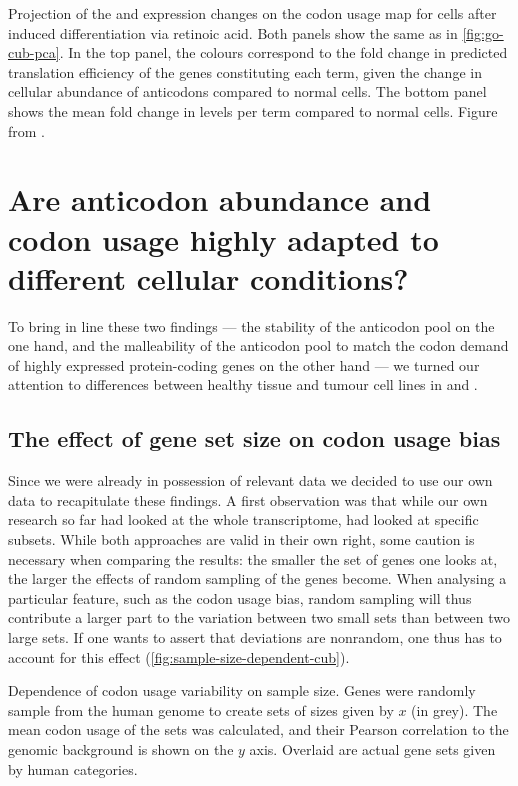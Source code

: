     {Projection of the \trna and \mrna expression changes on the codon usage
    map for cells after induced differentiation via retinoic acid.}
    {Both panels show the same \pca as in \cref{fig:go-cub-pca}. In the top
    panel, the colours correspond to the fold change in predicted translation
    efficiency of the genes constituting each \go term, given the change in
    cellular abundance of \trna anticodons compared to normal cells. The bottom
    panel shows the mean fold change in \mrna levels per \go term compared to
    normal cells. Figure from \citet{Gingold:2014}.}

\section{Are  anticodon abundance and codon usage highly adapted to
different cellular conditions?}

To bring in line these two findings — the stability of the anticodon pool on the
one hand, and the malleability of the anticodon pool to match the codon demand
of highly expressed protein-coding genes on the other hand — we turned our
attention to differences between healthy tissue and tumour cell lines in \mmu
and \hsa.

\subsection{The effect of gene set size on codon usage bias}

Since we were already in possession of relevant \trna data we decided to use our
own data to recapitulate these findings. A first observation was that while our
own research so far had looked at the whole transcriptome, \citet{Gingold:2014}
had looked at specific subsets. While both approaches are valid in their own
right, some caution is necessary when comparing the results: the smaller the set
of genes one looks at, the larger the effects of random sampling of the genes
become. When analysing a particular feature, such as the codon usage bias,
random sampling will thus contribute a larger part to the variation between two
small sets than between two large sets. If one wants to assert that deviations
are nonrandom, one thus has to account for this effect
(\cref{fig:sample-size-dependent-cub}).

    {Dependence of codon usage variability on sample size.}
    {Genes were randomly sample from the human genome to create sets of sizes
    given by \(x\) (in grey). The mean codon usage of the sets was calculated,
    and their Pearson correlation to the genomic background is shown on the
    \(y\) axis. Overlaid are actual gene sets given by human \go categories.}

